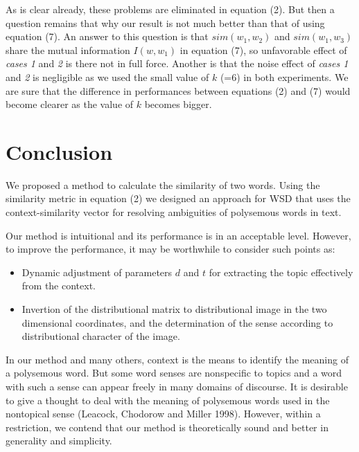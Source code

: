 As is clear already, these problems are eliminated in equation (2).  But then a question remains 
that why our result is not much better than that of using equation (7).  An answer to this question 
is that $sim(w_1,w_2)$ and $sim(w_1,w_3)$ share the mutual information $I(w,w_1)$ in
 equation (7), so unfavorable effect of {\it cases 1} and {\it 2} is there not in full force.
  Another is that the noise effect of {\it cases 1} and {\it 2} is negligible as we used the
 small value of $k$ (=6) in both experiments.  We are 
sure that the difference in performances between equations (2) and (7) would become clearer 
as the value of $k$ becomes bigger.

\section{Conclusion}

We proposed a method to calculate the similarity of two words.  Using the similarity metric
 in equation (2) we designed an approach for WSD that uses the context-similarity vector for
 resolving ambiguities of polysemous words in text.

Our method is intuitional and its performance is in an acceptable level. However, to 
improve the performance, it may be worthwhile to consider such points as:
\begin{itemize}
\item Dynamic adjustment of parameters $d$ and $t$ for extracting the topic effectively from the context.
\item Invertion of the distributional matrix to distributional image in the two dimensional coordinates, 
      and the determination of the sense according to distributional character of the image.
\end{itemize}

In our method and many others, context is the means to identify the meaning of a polysemous word.  But 
some word senses are nonspecific to topics and a word with such a sense can appear freely in many 
domains of discourse.  It is desirable to give a thought to deal with the meaning of polysemous words 
used in the nontopical sense (Leacock, Chodorow and Miller 1998). However, within a restriction, 
we contend that our method is 
theoretically sound and better in generality and simplicity.











